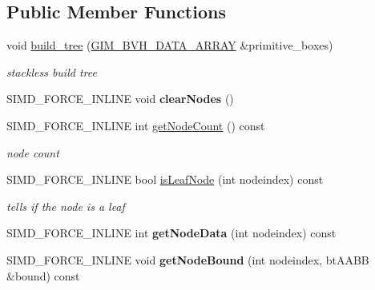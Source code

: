 \subsection*{Public Member Functions}
\textbf{ }\par
\begin{DoxyCompactItemize}
\item 
void \hyperlink{classbtBvhTree_aed589b2985838c6268597f4f64a96c46}{build\+\_\+tree} (\hyperlink{classGIM__BVH__DATA__ARRAY}{G\+I\+M\+\_\+\+B\+V\+H\+\_\+\+D\+A\+T\+A\+\_\+\+A\+R\+R\+AY} \&primitive\+\_\+boxes)
\begin{DoxyCompactList}\small\item\em stackless build tree \end{DoxyCompactList}\item 
\mbox{\label{classbtBvhTree_ad9963d9620aad83024c3d01d7c08a341}} 
S\+I\+M\+D\+\_\+\+F\+O\+R\+C\+E\+\_\+\+I\+N\+L\+I\+NE void {\bfseries clear\+Nodes} ()
\item 
\mbox{\label{classbtBvhTree_a08d1a83b6d252b96cfc2a8d512c54c7e}} 
S\+I\+M\+D\+\_\+\+F\+O\+R\+C\+E\+\_\+\+I\+N\+L\+I\+NE int \hyperlink{classbtBvhTree_a08d1a83b6d252b96cfc2a8d512c54c7e}{get\+Node\+Count} () const
\begin{DoxyCompactList}\small\item\em node count \end{DoxyCompactList}\item 
\mbox{\label{classbtBvhTree_a8394787a60291cad85bcf1afc4d94874}} 
S\+I\+M\+D\+\_\+\+F\+O\+R\+C\+E\+\_\+\+I\+N\+L\+I\+NE bool \hyperlink{classbtBvhTree_a8394787a60291cad85bcf1afc4d94874}{is\+Leaf\+Node} (int nodeindex) const
\begin{DoxyCompactList}\small\item\em tells if the node is a leaf \end{DoxyCompactList}\item 
\mbox{\label{classbtBvhTree_ac0813921b278d9891d0e05b49abfd68c}} 
S\+I\+M\+D\+\_\+\+F\+O\+R\+C\+E\+\_\+\+I\+N\+L\+I\+NE int {\bfseries get\+Node\+Data} (int nodeindex) const
\item 
\mbox{\label{classbtBvhTree_acdd8214ed29b797fb3a45d654f53c9e1}} 
S\+I\+M\+D\+\_\+\+F\+O\+R\+C\+E\+\_\+\+I\+N\+L\+I\+NE void {\bfseries get\+Node\+Bound} (int nodeindex, bt\+A\+A\+BB \&bound) const

\end{DoxyCompactItemize}
